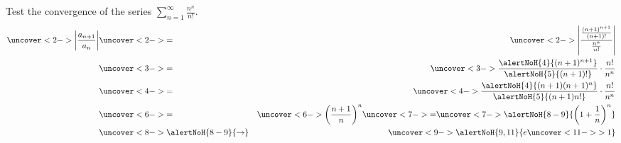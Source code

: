 \begin{frame}
\begin{example}
Test the convergence of the series $\displaystyle \sum_{n=1}^\infty \frac{n^n}{n!}$.
\abovedisplayskip=0pt
\belowdisplayskip=0pt
\begin{eqnarray*}
\uncover<2->{%
\left| \frac{a_{n+1}}{a_n}\right| %
}%
 & \uncover<2->{=} & %
\uncover<2->{%
\left| \frac{\frac{(n+1)^{n+1}}{(n+1)!}}{\frac{n^n}{n!}}\right| %
}\\%
 & \uncover<3->{=} & %
\uncover<3->{%
\frac{\alertNoH{ 4}{(n+1)^{n+1}}}{\alertNoH{ 5}{(n+1)!}}\cdot \frac{n!}{n^n}%
}\\%
 & \uncover<4->{=} & %
\uncover<4->{%
\frac{\alertNoH{ 4}{(n+1)(n+1)^{n}}}{\alertNoH{ 5}{(n+1)n!}}\cdot \frac{n!}{n^n}%
}\\%
 & \uncover<6->{=} & %
\uncover<6->{%
\left( \frac{n+1}{n}\right)^n%
}%
  \uncover<7->{=}  %
\uncover<7->{%
\alertNoH{ 8-9}{%
\left( 1 + \frac{1}{n}\right)^n%
}%
}\\%
 & \uncover<8->{\alertNoH{ 8-9}{\to}} & %
\uncover<9->{%
\alertNoH{ 9,11}{%
e \uncover<11->{ > 1 }
}%
}%
\end{eqnarray*}
%
\end{example}
\end{frame}
